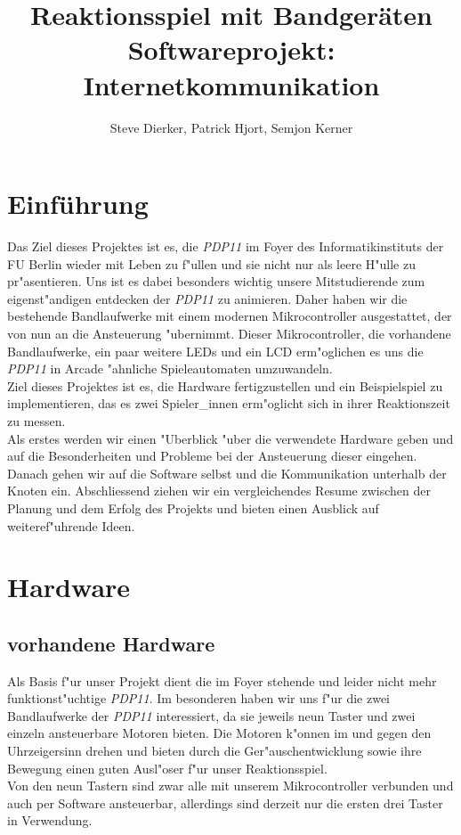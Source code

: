 \documentclass[a4paper]{article}
\title{%
  Reaktionsspiel mit Bandgeräten \\
  \large Softwareprojekt: Internetkommunikation}
\author{Steve Dierker, Patrick Hjort, Semjon Kerner}
\begin{document}
\maketitle

\section{Einführung}
  \label{sec:intro}
  Das Ziel dieses Projektes ist es, die \textit{PDP11} im Foyer des
  Informatikinstituts der FU Berlin wieder mit Leben zu f"ullen und sie nicht
  nur als leere H"ulle zu pr"asentieren. Uns ist es dabei besonders wichtig
  unsere Mitstudierende zum eigenst"andigen entdecken der \textit{PDP11} zu
  animieren.  Daher haben wir die bestehende Bandlaufwerke mit einem modernen
  Mikrocontroller ausgestattet, der von nun an die Ansteuerung "ubernimmt.
  Dieser Mikrocontroller, die vorhandene Bandlaufwerke, ein paar weitere LEDs
  und ein LCD erm"oglichen es uns die \textit{PDP11} in Arcade "ahnliche
  Spieleautomaten umzuwandeln.\\
  Ziel dieses Projektes ist es, die Hardware fertigzustellen und ein
  Beispielspiel zu implementieren, das es zwei Spieler\_innen erm"oglicht sich
  in ihrer Reaktionszeit zu messen.\\
  Als erstes werden wir einen "Uberblick "uber die verwendete Hardware geben
  und auf die Besonderheiten und Probleme bei der Ansteuerung dieser eingehen.
  Danach gehen wir auf die Software selbst und die Kommunikation unterhalb der
  Knoten ein. Abschliessend ziehen wir ein vergleichendes Resume zwischen der
  Planung und dem Erfolg des Projekts und bieten einen Ausblick auf
  weiteref"uhrende Ideen.

\section{Hardware}
  \label{sec:hardware}
  \subsection{vorhandene Hardware}
    \label{sec:hardware_existing}
    Als Basis f"ur unser Projekt dient die im Foyer stehende und leider nicht
    mehr funktionst"uchtige \textit{PDP11}. Im besonderen haben wir uns f"ur
    die zwei Bandlaufwerke der \textit{PDP11} interessiert, da sie jeweils neun
    Taster und zwei einzeln ansteuerbare Motoren bieten. Die Motoren k"onnen im
    und gegen den Uhrzeigersinn drehen und bieten durch die
    Ger"auschentwicklung sowie ihre Bewegung einen guten Ausl"oser f"ur unser
    Reaktionsspiel.\\
    Von den neun Tastern sind zwar alle mit unserem Mikrocontroller verbunden
    und auch per Software ansteuerbar, allerdings sind derzeit nur die
    ersten drei Taster in Verwendung.
\end{document}
